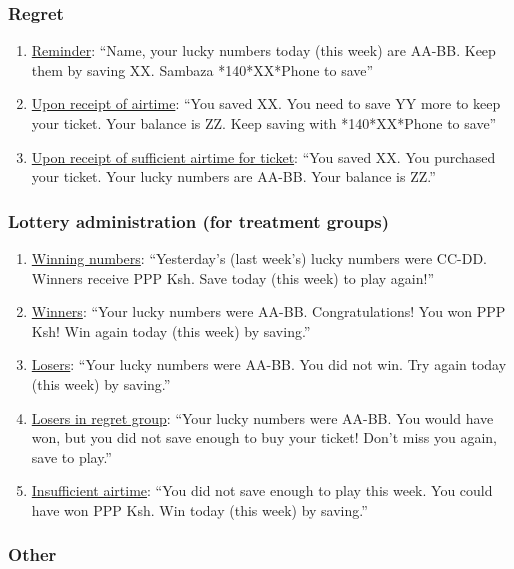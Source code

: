 \documentclass[11pt]{article}
\begin{document}
        \subsubsection{Regret}

            \begin{enumerate}
                \item \underline{Reminder}: ``{Name}, your lucky numbers today (this week) are AA-BB. Keep them by saving XX. Sambaza *140*XX*Phone to save''
                \item \underline{Upon receipt of airtime}: ``You saved XX.  You need to save YY more to keep your ticket. Your balance is ZZ. Keep saving with *140*XX*Phone to save''
                \item \underline{Upon receipt of sufficient airtime for ticket}: ``You saved XX. You purchased your ticket. Your lucky numbers are AA-BB. Your balance is ZZ.''
            \end{enumerate}

        \subsubsection{Lottery administration (for treatment groups)}

            \begin{enumerate}
                \item \underline{Winning numbers}: ``Yesterday’s (last week’s) lucky numbers were CC-DD.  Winners receive PPP Ksh.  Save today (this week) to play again!''
                \item \underline{Winners}: ``Your lucky numbers were AA-BB.  Congratulations!  You won PPP Ksh!  Win again today (this week) by saving.''
                \item \underline{Losers}: ``Your lucky numbers were AA-BB.  You did not win.  Try again today (this week) by saving.''
                \item \underline{Losers in regret group}: ``Your lucky numbers were AA-BB.  You would have won, but you did not save enough to buy your ticket!  Don’t miss you again, save to play.''
                \item \underline{Insufficient airtime}: ``You did not save enough to play this week.  You could have won PPP Ksh.  Win today (this week) by saving.''
            \end{enumerate}

        \subsubsection{Other}
\end{document}
